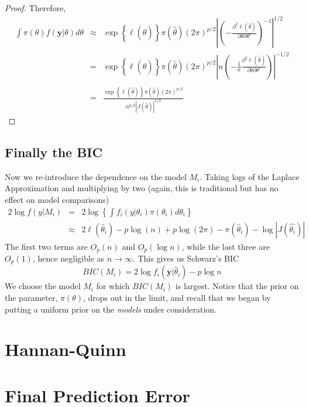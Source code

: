 \documentclass[12pt]{article}
\theoremstyle{definition}
\begin{document}
\begin{proof}
Therefore,
	\begin{eqnarray*}
		\int \pi(\theta)f(\mathbf{y}|\theta)d\theta &\approx& \exp\left\{ \ell(\hat{\theta}) \right\}\pi(\hat{\theta}) \left(2\pi\right)^{p/2}\left| \left(-\frac{\partial^2 \ell(\hat{\theta})}{\partial \theta \partial \theta'}\right)^{-1} \right|^{1/2}\\
		&=&  \exp\left\{ \ell(\hat{\theta}) \right\}\pi(\hat{\theta}) \left(2\pi\right)^{p/2}\left|n \left(-\frac{1}{n}\frac{\partial^2 \ell(\hat{\theta})}{\partial \theta \partial \theta'}\right) \right|^{-1/2}\\\\
		&=&\frac{ \exp\left\{ \ell(\hat{\theta}) \right\}\pi(\hat{\theta}) \left(2\pi\right)^{p/2}}{n^{p/2}\left| J(\hat{\theta}) \right|^{1/2}}
	\end{eqnarray*}
\end{proof}


\subsection{Finally the BIC}
Now we re-introduce the dependence on the model $M_i$. Taking logs of the Laplace Approximation and multiplying by two (again, this is traditional but has no effect on model comparisons)
	\begin{eqnarray*}
		2 \log f(y|M_i) &=& 2 \log \left\{ \int f_i(y|\theta_i)\pi(\theta_i)d\theta_i \right\}\\
		&\approx& 2\ell(\hat{\theta}_i) -p\log(n) + p \log(2\pi)- \pi(\hat{\theta}_i)-\log \left| J(\hat{\theta_i}) \right|
	\end{eqnarray*}
The first two terms are $O_p(n)$ and $O_p(\log{n})$, while the last three are $O_p(1)$, hence negligible as $n\rightarrow \infty$. This gives us Schwarz's BIC
	$$BIC(M_i) = 2\log{f_i(\mathbf{y}|\hat{\theta}_i)} - p\log{n}$$
We choose the model $M_i$ for which $BIC(M_i)$ is largest. Notice that the prior on the parameter, $\pi(\theta)$, drops out in the limit, and recall that we began by putting a uniform prior on the \emph{models} under consideration. 

\section{Hannan-Quinn}

\section{Final Prediction Error}
\end{document}
